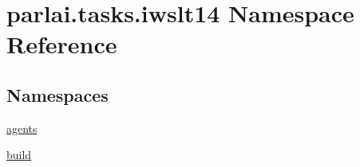 \hypertarget{namespaceparlai_1_1tasks_1_1iwslt14}{}\section{parlai.\+tasks.\+iwslt14 Namespace Reference}
\label{namespaceparlai_1_1tasks_1_1iwslt14}
\subsection*{Namespaces}
\begin{DoxyCompactItemize}
\item 
 \hyperlink{namespaceparlai_1_1tasks_1_1iwslt14_1_1agents}{agents}
\item 
 \hyperlink{namespaceparlai_1_1tasks_1_1iwslt14_1_1build}{build}
\end{DoxyCompactItemize}
